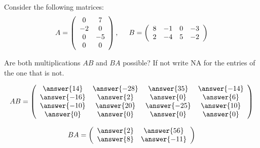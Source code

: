 \documentclass{ximera}
\begin{document}
\begin{exercise}
Consider the following matrices:
\begin{equation*}
A = \left(\begin{array}{cc}
0 & 7\\
-2 & 0\\
0 & -5 \\
0 & 0
\end{array}\right), \hspace{.5cm} B = \left(\begin{array}{cccc}
8 & -1 & 0 & -3\\
2 & -4 & 5 & -2
\end{array}\right)
\end{equation*}

Are both multiplications $AB$ and $BA$ possible? If not write NA for the entries of the one that is not.

\begin{prompt}
\begin{equation*}
AB = \left(\begin{array}{cccc}
\answer{14} & \answer{-28} & \answer{35} & \answer{-14}\\
\answer{-16} & \answer{2} & \answer{0} & \answer{6}\\
\answer{-10} & \answer{20} & \answer{-25} & \answer{10}\\
\answer{0} & \answer{0} & \answer{0} & \answer{0}
\end{array}\right)
\end{equation*}

\begin{equation*}
BA = \left(\begin{array}{cc}
\answer{2} & \answer{56}\\
\answer{8} & \answer{-11}
\end{array}\right)
\end{equation*}
\end{prompt}

\end{exercise}
\end{document}
